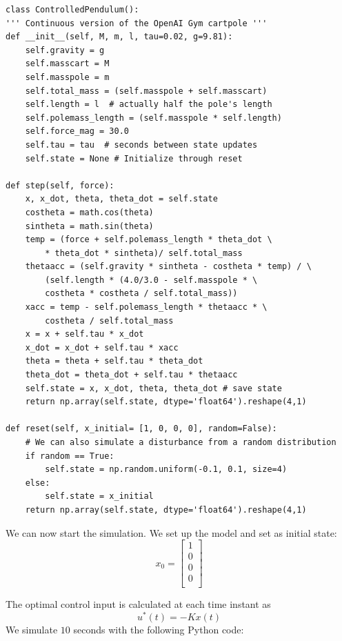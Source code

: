 \begin{verbatim}
class ControlledPendulum():
''' Continuous version of the OpenAI Gym cartpole '''
def __init__(self, M, m, l, tau=0.02, g=9.81):
    self.gravity = g
    self.masscart = M
    self.masspole = m
    self.total_mass = (self.masspole + self.masscart)
    self.length = l  # actually half the pole's length
    self.polemass_length = (self.masspole * self.length)
    self.force_mag = 30.0
    self.tau = tau  # seconds between state updates
    self.state = None # Initialize through reset
    
def step(self, force):
    x, x_dot, theta, theta_dot = self.state
    costheta = math.cos(theta)
    sintheta = math.sin(theta)
    temp = (force + self.polemass_length * theta_dot \
        * theta_dot * sintheta)/ self.total_mass
    thetaacc = (self.gravity * sintheta - costheta * temp) / \
        (self.length * (4.0/3.0 - self.masspole * \
        costheta * costheta / self.total_mass))
    xacc = temp - self.polemass_length * thetaacc * \ 
        costheta / self.total_mass
    x = x + self.tau * x_dot
    x_dot = x_dot + self.tau * xacc
    theta = theta + self.tau * theta_dot
    theta_dot = theta_dot + self.tau * thetaacc
    self.state = x, x_dot, theta, theta_dot # save state
    return np.array(self.state, dtype='float64').reshape(4,1)

def reset(self, x_initial= [1, 0, 0, 0], random=False):
    # We can also simulate a disturbance from a random distribution
    if random == True:
        self.state = np.random.uniform(-0.1, 0.1, size=4)
    else:
        self.state = x_initial
    return np.array(self.state, dtype='float64').reshape(4,1)
\end{verbatim}

We can now start the simulation. We set up the model and set as initial state:
\begin{equation}
    x_0 = \begin{bmatrix}
        1\\
        0\\
        0\\
        0\\
    \end{bmatrix}
\end{equation}

The optimal control input is calculated at each time instant as 
\begin{equation}
    u^*(t) = -K x(t) 
\end{equation}
We simulate $10$ seconds with the following Python code:

